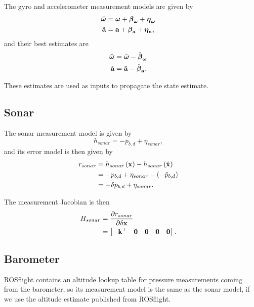 \documentclass[english]{article}
\begin{document}
The gyro and accelerometer measurement models are given by
\begin{align}
\tilde{\boldsymbol{\omega}} & = \boldsymbol{\omega} + \boldsymbol{\beta}_{\boldsymbol{\omega}} + \boldsymbol{\eta}_{\boldsymbol{\omega}} \\
\tilde{\bf{a}} & = {\bf{a}} + \boldsymbol{\beta}_{\bf{a}} + \boldsymbol{\eta}_{\bf{a}},
\end{align}
and their best estimates are
\begin{align}
\hat{\boldsymbol{\omega}} & = \tilde{\boldsymbol{\omega}} - \hat{\boldsymbol{\beta}}_{\boldsymbol{\omega}} \\
\hat{\bf{a}} & = \tilde{\bf{a}} - \hat{\boldsymbol{\beta}}_{\bf{a}}.
\end{align}

These estimates are used as inputs to propagate the state estimate.

\subsection{Sonar}

The sonar measurement model is given by
\begin{equation}
h_{sonar} = -p_{b,d} + \eta_{sonar},
\end{equation}
and its error model is then given by
\begin{align}
r_{sonar} & = h_{sonar}\left({\bf x}\right) - h_{sonar}\left(\hat{{\bf x}}\right) \\
& = -p_{b,d} + \eta_{sonar} - \left(-\hat{p}_{b,d}\right) \\
& = -\delta p_{b,d} + \eta_{sonar}.
\end{align}

The measurement Jacobian is then
\begin{align}
H_{sonar} & = \frac{\partial r_{sonar}}{\partial \delta {\bf x}} \\
& = \begin{bmatrix} -{\bf k}^\top & {\bf 0} & {\bf 0} & {\bf 0} & {\bf 0} \end{bmatrix}.
\end{align}

\subsection{Barometer}

ROSflight contains an altitude lookup table for pressure measurements coming from the barometer, so its measurement model is the same as the sonar model, if we use the altitude estimate published from ROSflight.
\end{document}
